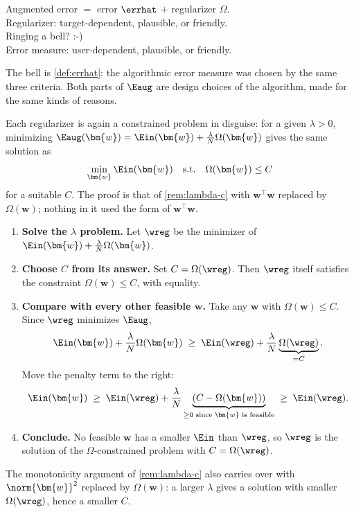 \begin{moral}
    Augmented error \(=\) error \(\errhat\) \(+\) regularizer \(\Omega\).\\
    Regularizer: target-dependent, plausible, or friendly.\\
    Ringing a bell? :-)\\
    Error measure: user-dependent, plausible, or friendly.
\end{moral}

The bell is \autoref{def:errhat}: the algorithmic error measure was chosen by
the same three criteria. Both parts of \(\Eaug\) are design choices of the
algorithm, made for the same kinds of reasons.

\begin{remark}
    Each regularizer is again a constrained problem in disguise: for a given
    \(\lambda > 0\), minimizing
    \(\Eaug(\bm{w}) = \Ein(\bm{w}) + \frac{\lambda}{N} \Omega(\bm{w})\) gives the
    same solution as
    \[
        \min_{\bm{w}} \Ein(\bm{w}) \quad \text{s.t.} \quad \Omega(\bm{w}) \le C
    \]
    for a suitable \(C\). The proof is that of \autoref{rem:lambda-c} with
    \(\bm{w}^\top \bm{w}\) replaced by \(\Omega(\bm{w})\); nothing in it used
    the form of \(\bm{w}^\top \bm{w}\).
    \begin{enumerate}[(1)]
        \item \textbf{Solve the \(\lambda\) problem.} Let \(\wreg\) be the
            minimizer of \(\Ein(\bm{w}) + \frac{\lambda}{N} \Omega(\bm{w})\).
        \item \textbf{Choose \(C\) from its answer.} Set \(C =
            \Omega(\wreg)\). Then \(\wreg\) itself satisfies the constraint
            \(\Omega(\bm{w}) \le C\), with equality.
        \item \textbf{Compare with every other feasible \(\bm{w}\).} Take any
            \(\bm{w}\) with \(\Omega(\bm{w}) \le C\). Since \(\wreg\)
            minimizes \(\Eaug\),
            \[
                \Ein(\bm{w}) + \frac{\lambda}{N} \Omega(\bm{w}) \;\ge\;
                \Ein(\wreg) + \frac{\lambda}{N} \underbrace{\Omega(\wreg)}_{=
                C} .
            \]
            Move the penalty term to the right:
            \[
                \Ein(\bm{w}) \;\ge\; \Ein(\wreg) + \frac{\lambda}{N}
                \underbrace{\left( C - \Omega(\bm{w}) \right)}_{\ge 0
                \text{ since } \bm{w} \text{ is feasible}} \;\ge\;
                \Ein(\wreg) .
            \]
        \item \textbf{Conclude.} No feasible \(\bm{w}\) has a smaller \(\Ein\)
            than \(\wreg\), so \(\wreg\) is the solution of the
            \(\Omega\)-constrained problem with \(C = \Omega(\wreg)\).
    \end{enumerate}
    The monotonicity argument of \autoref{rem:lambda-c} also carries over
    with \(\norm{\bm{w}}^2\) replaced by \(\Omega(\bm{w})\): a larger
    \(\lambda\) gives a solution with smaller \(\Omega(\wreg)\), hence a
    smaller \(C\).


\end{remark}
